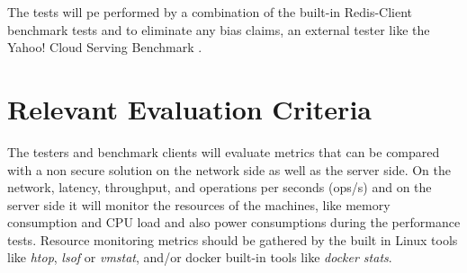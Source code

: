 The tests will pe performed by a combination of the built-in Redis-Client benchmark tests \cite{redis_benchmark_cli:1} and to eliminate any bias claims, an external tester like the Yahoo! Cloud Serving Benchmark \cite{yahoo_benchmark:1}.

\section{Relevant Evaluation Criteria} %
\label{sec:relevant_evaluation_criteria}

The testers and benchmark clients will evaluate metrics that can be compared with a non secure solution on the network side as well as the server side. On the network, latency, throughput, and operations per seconds (ops/s) and on the server side it will monitor the resources of the machines, like memory consumption and CPU load and also power consumptions during the performance tests. Resource monitoring metrics should be gathered by the built in Linux tools like \textit{htop}, \textit{lsof} or \textit{vmstat}, and/or docker built-in tools like \textit{docker stats}.
